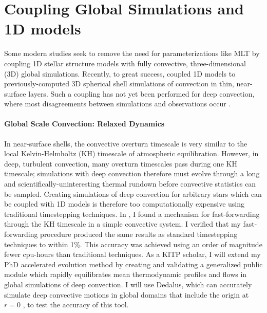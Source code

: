 \documentclass[preprint, hmargin=1in, vmargin=1in]{aastex62}
\begin{document}
\section*{\textbf{Coupling Global Simulations and 1D models}}
Some modern studies seek to remove the need for parameterizations like MLT by coupling 1D stellar structure models with fully convective, three-dimensional (3D) global simulations.
Recently, to great success, \citet{jorgensen&weiss2019} coupled 1D models to previously-computed 3D spherical shell simulations of convection in thin, near-surface layers.
Such a coupling has not yet been performed for deep convection, where most disagreements between simulations and observations occur \citep[the Convective Conundrum,][]{hanasoge&all2015}.

\paragraph{Global Scale Convection: Relaxed Dynamics}
In near-surface shells, the convective overturn timescale is very similar to the local Kelvin-Helmholtz (KH) timescale of atmospheric equilibration.
However, in deep, turbulent convection, many overturn timescales pass during one KH timescale; simulations with deep convection therefore must evolve through a long and scientifically-uninteresting thermal rundown before convective statistics can be sampled.
Creating simulations of deep convection for arbitrary stars which can be coupled with 1D models is therefore too computationally expensive using traditional timestepping techniques.
In \citet{anders&all2018}, I found a mechanism for fast-forwarding through the KH timescale in a simple convective system.
I verified that my fast-forwarding procedure produced the same results as standard timestepping techniques to within 1\%.
This accuracy was achieved using an order of magnitude fewer cpu-hours than traditional techniques.
As a KITP scholar, I will extend my PhD accelerated evolution method \citep{anders&all2018} by creating and validating a generalized public module which rapidly equilibrates mean thermodynamic profiles and flows in global simulations of deep convection.
I will use Dedalus, which can accurately simulate deep convective motions in global domains that include the origin at $r = 0$ \citep[as visualized in Fig.~\ref{fig:mdwarf}, and tested in][]{lecoanet&all2019}, to test the accuracy of this tool.
\end{document}

